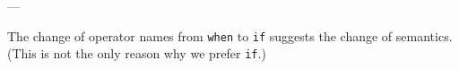 ---

The change of operator names from \texttt{when} to \texttt{if} suggests the change of semantics. (This is not the only reason why we prefer \texttt{if}.) 

%
%
%
%
%
%
%
